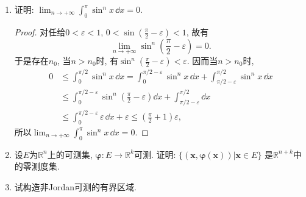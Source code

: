 \begin{quiza}
\begin{enumerate}
\item 证明: \(\lim_{n\rightarrow+\infty}\int_{0}^{\pi}\sin^nx\,\dd x=0.\)
\begin{proof}
对任给\(0<\varepsilon<1\), \(0<\sin\left(\frac{\pi}{2}-\varepsilon\right)<1\), 故有
\[\lim_{n\rightarrow+\infty}\sin^n\left(\frac{\pi}{2}-\varepsilon\right)=0.\]
于是存在\(n_0\), 当\(n>n_0\)时, 有\(\sin^n\left(\frac{\pi}{2}-\varepsilon\right)<\varepsilon\). 
因而当\(n>n_0\)时,\[\begin{split}
0&\leqslant\int_{0}^{\pi/2}\sin^nx\,\dd x
=\int_{0}^{\pi/2-\varepsilon}\sin^nx\,\dd x+\int_{\pi/2-\varepsilon}^{\pi/2}\sin^nx\,\dd x\\
&\leqslant\int_{0}^{\pi/2-\varepsilon}\sin^n\left(\frac{\pi}{2}-\varepsilon\right)\dd x+\int_{\pi/2-\varepsilon}^{\pi/2}\dd x\\
&\leqslant\int_{0}^{\pi/2-\varepsilon}\varepsilon\,\dd x+\varepsilon
\leqslant\left(\frac{\pi}{2}+1\right)\varepsilon,
\end{split}\]所以\(\lim_{n\rightarrow+\infty}\int_{0}^{\pi}\sin^nx\,\dd x=0.\)
\end{proof}

\item 设\(E\)为\(\mathbb{R}^n\)上的可测集, \(\boldsymbol{\varphi}:E\rightarrow\mathbb{R}^k\)可测. 
证明: \(\{(\boldsymbol{x},\boldsymbol{\varphi}(\boldsymbol{x}))\big|\boldsymbol{x}\in E\}\)
是\(\mathbb{R}^{n+k}\)中的零测度集.

\item 试构造非Jordan可测的有界区域.
\end{enumerate}
\end{quiza}

